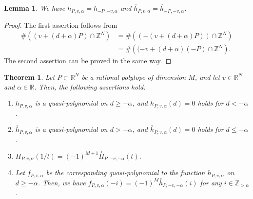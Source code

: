 \documentclass[10pt,a4paper]{amsart}
\theoremstyle{plain}
\newtheorem{thm}[cdrthm]{Theorem}
\newtheorem{lem}[cdrthm]{Lemma}
\theoremstyle{definition}
\theoremstyle{remark}
\begin{document}
\begin{lem}\label{lem:sym}
We have $h_{P,v,\alpha} = h_{-P,-v,\alpha}$ and $\overset{\circ}{h}_{P,v,\alpha} = \overset{\circ}{h}_{-P,-v,\alpha}$. 
\end{lem}
\begin{proof}
The first assertion follows from
\begin{align*}
\# \left( (v + (d + \alpha) P) \cap \mathbb{Z}^N \right) 
&= \# \left( (- (v + (d + \alpha) P)) \cap \mathbb{Z}^N \right) \\
&= \# \left( (-v + (d + \alpha) (-P) \cap \mathbb{Z}^N \right). 
\end{align*}
The second assertion can be proved in the same way.
\end{proof}

\begin{thm}\label{thm:Eh}
Let $P \subset \mathbb{R}^N$ be a rational polytope of dimension $M$, and let $v \in \mathbb{R}^N$ and $\alpha \in \mathbb{R}$. 
Then, the following assertions hold: 
\begin{enumerate}
\item $h_{P, v, \alpha}$ is a quasi-polynomial on $d \ge - \alpha$, and 
$h_{P, v, \alpha}(d) = 0$ holds for $d < - \alpha$. 

\item $\overset{\circ}{h} _{P, v, \alpha}$ is a quasi-polynomial on $d > - \alpha$, and 
$\overset{\circ}{h} _{P, v, \alpha}(d) = 0$ holds for $d \le - \alpha$. 

\item $H_{P, v, \alpha}(1/t) = (-1)^{M+1} \overset{\circ}{H}_{P, -v, - \alpha}(t)$. 

\item 
Let $f_{P,v,\alpha}$ be the corresponding quasi-polynomial to the function $h_{P, v, \alpha}$ on $d \ge - \alpha$. 
Then, we have 
$f_{P,v,\alpha}(-i) = (-1)^M \overset{\circ}{h}_{P, -v, - \alpha}(i)$ for any $i \in \mathbb{Z}_{> \alpha}$. 
\end{enumerate}
\end{thm}
\end{document}
